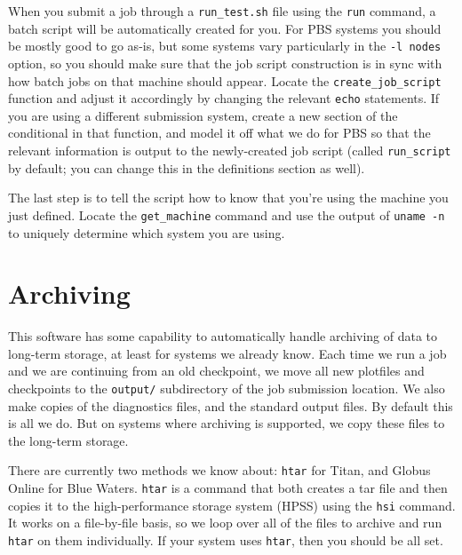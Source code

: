 \documentclass[12pt]{book}
\begin{document}
When you submit a job through a \texttt{run\_test.sh} file using the \texttt{run} command, 
a batch script will be automatically created for you. For PBS systems you should be mostly 
good to go as-is, but some systems vary particularly in the \texttt{-l nodes} option, so 
you should make sure that the job script construction is in sync with how batch jobs 
on that machine should appear. Locate the \texttt{create\_job\_script} function and adjust it 
accordingly by changing the relevant \texttt{echo} statements. If you are using a different submission
system, create a new section of the conditional in that function, and model it off what we do for PBS
so that the relevant information is output to the newly-created job script (called \texttt{run\_script} 
by default; you can change this in the definitions section as well).

The last step is to tell the script how to know that you're using the machine you just defined. 
Locate the \texttt{get\_machine} command and use the output of \texttt{uname -n} to uniquely determine 
which system you are using.

\section{Archiving}
\label{sec:archiving}

This software has some capability to automatically handle archiving of data to long-term storage,
at least for systems we already know. Each time we run a job and we are continuing from an old checkpoint,
we move all new plotfiles and checkpoints to the \texttt{output/} subdirectory of the job submission 
location. We also make copies of the diagnostics files, and the standard output files. By default this is 
all we do. But on systems where archiving is supported, we copy these files to the long-term storage.

There are currently two methods we know about: \texttt{htar} for Titan, and Globus Online for Blue Waters.
\texttt{htar} is a command that both creates a tar file and then copies it to the high-performance storage system 
(HPSS) using the \texttt{hsi} command. It works on a file-by-file basis, so we loop over all of the files to 
archive and run \texttt{htar} on them individually. If your system uses \texttt{htar}, then you should be all set.
\end{document}
